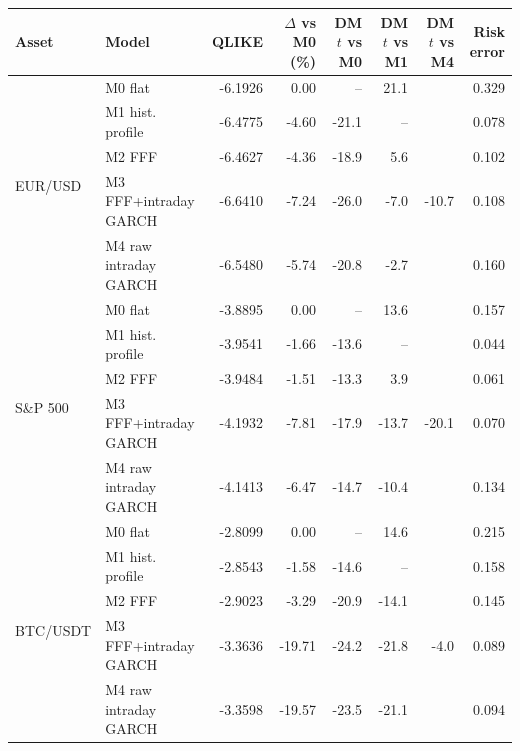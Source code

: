 \begin{tabular}{llrrrrrr}
\toprule
Asset & Model & QLIKE & $\Delta$ vs M0 (\%) & DM $t$ vs M0 & DM $t$ vs M1 & DM $t$ vs M4 & Risk error \\
\midrule
\multirow{5}{*}{EUR/USD} & M0 flat & -6.1926 & 0.00 & -- & 21.1 &  & 0.329 \\
 & M1 hist. profile & -6.4775 & -4.60 & -21.1 & -- &  & 0.078 \\
 & M2 FFF & -6.4627 & -4.36 & -18.9 & 5.6 &  & 0.102 \\
 & M3 FFF+intraday GARCH & -6.6410 & -7.24 & -26.0 & -7.0 & -10.7 & 0.108 \\
 & M4 raw intraday GARCH & -6.5480 & -5.74 & -20.8 & -2.7 &  & 0.160 \\
\midrule
\multirow{5}{*}{S\&P 500} & M0 flat & -3.8895 & 0.00 & -- & 13.6 &  & 0.157 \\
 & M1 hist. profile & -3.9541 & -1.66 & -13.6 & -- &  & 0.044 \\
 & M2 FFF & -3.9484 & -1.51 & -13.3 & 3.9 &  & 0.061 \\
 & M3 FFF+intraday GARCH & -4.1932 & -7.81 & -17.9 & -13.7 & -20.1 & 0.070 \\
 & M4 raw intraday GARCH & -4.1413 & -6.47 & -14.7 & -10.4 &  & 0.134 \\
\midrule
\multirow{5}{*}{BTC/USDT} & M0 flat & -2.8099 & 0.00 & -- & 14.6 &  & 0.215 \\
 & M1 hist. profile & -2.8543 & -1.58 & -14.6 & -- &  & 0.158 \\
 & M2 FFF & -2.9023 & -3.29 & -20.9 & -14.1 &  & 0.145 \\
 & M3 FFF+intraday GARCH & -3.3636 & -19.71 & -24.2 & -21.8 & -4.0 & 0.089 \\
 & M4 raw intraday GARCH & -3.3598 & -19.57 & -23.5 & -21.1 &  & 0.094 \\
\bottomrule
\end{tabular}